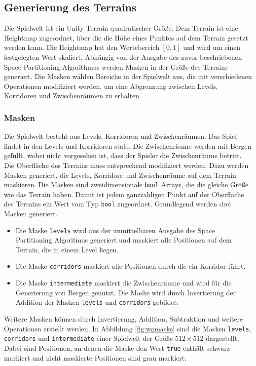 \subsection{Generierung des Terrains}
Die Spielwelt ist ein Unity Terrain quadratischer Größe. Dem Terrain ist eine Heightmap zugeordnet, über die die Höhe eines Punktes auf dem Terrain gesetzt werden kann. Die Heightmap hat den Wertebereich $[0,1]$ und wird um einen festgelegten Wert skaliert. Abhängig von der Ausgabe des zuvor beschriebenen Space Partitioning Algorithmus werden Masken in der Größe des Terrains generiert. Die Masken wählen Bereiche in der Spielwelt aus, die mit verschiedenen Operationen modifiziert werden, um eine Abgrenzung zwischen Levels, Korridoren und Zwischenräumen zu erhalten.
\subsubsection{Masken}\label{sec:terrainmask}
Die Spielwelt besteht aus Levels, Korridoren und Zwischenräumen. Das Spiel findet in den Levels und Korridoren statt. Die Zwischenräume werden mit Bergen gefüllt, wobei nicht vorgesehen ist, dass der Spieler die Zwischenräume betritt. Die Oberfläche des Terrains muss entsprechend modifiziert werden. Dazu werden Masken generiert, die Levels, Korridore und Zwischenräume auf dem Terrain maskieren. Die Masken sind zweidimensionale \texttt{bool} Arrays, die die gleiche Größe wie das Terrain haben. Damit ist jedem ganzzahligen Punkt auf der Oberfläche des Terrains ein Wert vom Typ \texttt{bool} zugeordnet. Grundlegend werden drei Masken generiert. \begin{itemize}
    \item Die Maske \texttt{levels} wird aus der unmittelbaren Ausgabe des Space Partitioning Algoritmus generiert und maskiert alle Positionen auf dem Terrain, die in einem Level liegen.
    \item Die Maske \texttt{corridors} maskiert alle Positionen durch die ein Korridor führt.
    \item Die Maske \texttt{intermediate} maskiert die Zwischenräume und wird für die Generierung von Bergen genutzt. Die Maske wird durch Invertierung der Addition der Masken \texttt{levels} und \texttt{corridors} gebildet.
\end{itemize}
Weitere Masken können durch Invertierung, Addition, Subtraktion und weitere Operationen erstellt werden. In Abbildung \ref{fig:wgmasks} sind die Masken \texttt{levels}, \texttt{corridors} und \texttt{intermediate} einer Spielwelt der Größe $512\times 512$ dargestellt. Dabei sind Positionen, an denen die Maske den Wert \texttt{true} enthält schwarz markiert und nicht maskierte Positionen sind grau markiert.


